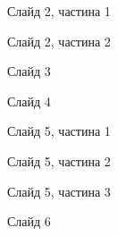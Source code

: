 \documentclass{thesis_utf8}
\begin{document}
% 

% 


\begin{figure}[!h]
    \centering
    \caption{Слайд 2, частина 1}
    \label{fig:Slide2_1}
\end{figure}

\begin{figure}[!h]
    \centering
    \caption{Слайд 2, частина 2}
    \label{fig:Slide2_2}
\end{figure}

\begin{figure}[!h]
    \centering
    \caption{Слайд 3}
    \label{fig:Slide3}
\end{figure}

\begin{figure}[!h]
    \centering
    \caption{Слайд 4}
    \label{fig:Slide4}
\end{figure}

\begin{figure}[!h]
    \centering
    \caption{Слайд 5, частина 1}
    \label{fig:Slide5_1}
\end{figure}

\begin{figure}[!h]
    \centering
    \caption{Слайд 5, частина 2}
    \label{fig:Slide5_2}
\end{figure}

\begin{figure}[!h]
    \centering
    \caption{Слайд 5, частина 3}
    \label{fig:Slide5_3}
\end{figure}

\begin{figure}[!h]
    \centering
    \caption{Слайд 6}
    \label{fig:Slide6}
\end{figure}
\end{document}
